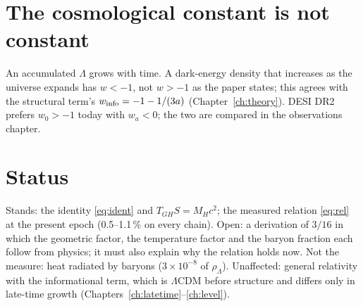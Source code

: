 \section{The cosmological constant is not constant}
An accumulated $\Lambda$ grows with time. A dark-energy density that increases as the universe expands has $w<-1$, not $w>-1$ as the paper
states; this agrees with the structural term's $w_{\rm info}=-1-1/(3a)$ (Chapter~\ref{ch:theory}). DESI DR2 prefers $w_0>-1$ today with $w_a<0$;
the two are compared in the observations chapter.

\section{Status}
Stands: the identity \eqref{eq:ident} and $T_{GH}S=M_Hc^2$; the measured relation \eqref{eq:rel} at the present epoch (0.5--1.1\,\% on every
chain). Open: a derivation of $3/16$ in which the geometric factor, the temperature factor and the baryon fraction each follow from physics;
it must also explain why the relation holds now. Not the measure: heat radiated by baryons ($3\times10^{-8}$ of $\rho_\Lambda$). Unaffected: general relativity with the informational
term, which is $\Lambda$CDM before structure and differs only in late-time growth (Chapters~\ref{ch:latetime}--\ref{ch:level}).
